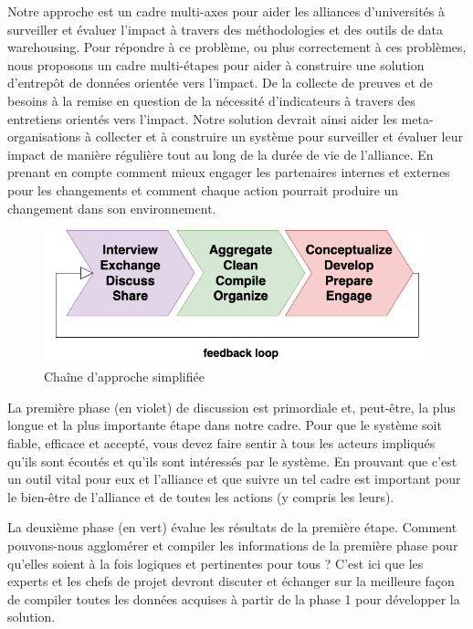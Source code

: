 Notre approche est un cadre multi-axes pour aider les alliances d'universités à surveiller et évaluer l'impact à travers des méthodologies et des outils de data warehousing. Pour répondre à ce problème, ou plus correctement à ces problèmes, nous proposons un cadre multi-étapes pour aider à construire une solution d'entrepôt de données orientée vers l'impact. De la collecte de preuves et de besoins à la remise en question de la nécessité d'indicateurs à travers des entretiens orientés vers l'impact. Notre solution devrait ainsi aider les meta-organisations à collecter et à construire un système pour surveiller et évaluer leur impact de manière régulière tout au long de la durée de vie de l'alliance. En prenant en compte comment mieux engager les partenaires internes et externes pour les changements et comment chaque action pourrait produire un changement dans son environnement.

\begin{figure}[h]
    \centering
    \includegraphics[width=1\linewidth]{Modele_Latex_CNRIUT2025//images/Diagrams-Simplified framework chain Our approach.drawio.png}
    \caption{Chaîne d'approche simplifiée}
    \label{fig:approach-simplified}
\end{figure}

La première phase (en violet) de discussion est primordiale et, peut-être, la plus longue et la plus importante étape dans notre cadre. Pour que le système soit fiable, efficace et accepté, vous devez faire sentir à tous les acteurs impliqués qu'ils sont écoutés et qu'ils sont intéressés par le système. En prouvant que c'est un outil vital pour eux et l'alliance et que suivre un tel cadre est important pour le bien-être de l'alliance et de toutes les actions (y compris les leurs).

La deuxième phase (en vert) évalue les résultats de la première étape. Comment pouvons-nous agglomérer et compiler les informations de la première phase pour qu'elles soient à la fois logiques et pertinentes pour tous ? C'est ici que les experts et les chefs de projet devront discuter et échanger sur la meilleure façon de compiler toutes les données acquises à partir de la phase 1 pour développer la solution.

